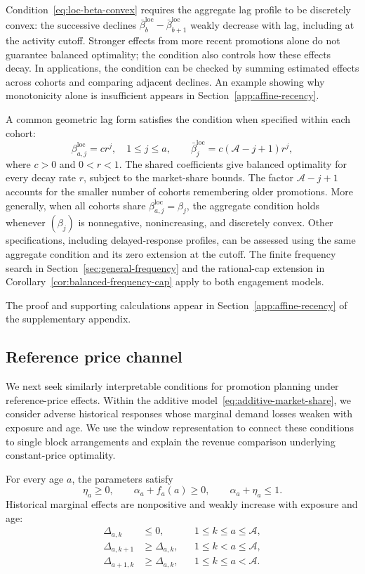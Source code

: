Condition~\eqref{eq:loc-beta-convex} requires the aggregate lag profile to be discretely convex: the successive declines \(\bar\beta_b^{\mathrm{loc}}-\bar\beta_{b+1}^{\mathrm{loc}}\) weakly decrease with lag, including at the activity cutoff. Stronger effects from more recent promotions alone do not guarantee balanced optimality; the condition also controls how these effects decay. In applications, the condition can be checked by summing estimated effects across cohorts and comparing adjacent declines. An example showing why monotonicity alone is insufficient appears in Section~\ref{app:affine-recency}.

A common geometric lag form satisfies the condition when specified within each cohort:
\[
 \beta_{a,j}^{\mathrm{loc}}=cr^j,\quad 1\le j\le a,
 \qquad \bar\beta_j^{\mathrm{loc}}=c(\mathcal A-j+1)r^j,
\]
where \(c>0\) and \(0<r<1\). The shared coefficients give balanced optimality for every decay rate \(r\), subject to the market-share bounds. The factor \(\mathcal A-j+1\) accounts for the smaller number of cohorts remembering older promotions. More generally, when all cohorts share \(\beta_{a,j}^{\mathrm{loc}}=\beta_j\), the aggregate condition holds whenever \((\beta_j)\) is nonnegative, nonincreasing, and discretely convex. Other specifications, including delayed-response profiles, can be assessed using the same aggregate condition and its zero extension at the cutoff. The finite frequency search in Section~\ref{sec:general-frequency} and the rational-cap extension in Corollary~\ref{cor:balanced-frequency-cap} apply to both engagement models.

The proof and supporting calculations appear in Section~\ref{app:affine-recency} of the supplementary appendix.
\par\endgroup

\begingroup\color{black}
\subsection{Reference price channel}
\label{sec:reference-engagement}
We next seek similarly interpretable conditions for promotion planning under reference-price effects. Within the additive model~\eqref{eq:additive-market-share}, we consider adverse historical responses whose marginal demand losses weaken with exposure and age. We use the window representation to connect these conditions to single block arrangements and explain the revenue comparison underlying constant-price optimality.

\begin{assumption}
\label{ass:additive-reference}
For every age \(a\), the parameters satisfy
\[
 \eta_a\ge0,
 \qquad \alpha_a+f_a(a)\ge0,
 \qquad \alpha_a+\eta_a\le1.
\]
Historical marginal effects are nonpositive and weakly increase with exposure and age:
\[
\begin{aligned}
 \Delta_{a,k}&\le0,
     &&1\le k\le a\le\mathcal A,\\
 \Delta_{a,k+1}&\ge\Delta_{a,k},
     &&1\le k<a\le\mathcal A,\\
 \Delta_{a+1,k}&\ge\Delta_{a,k},
     &&1\le k\le a<\mathcal A.
\end{aligned}
\]
\end{assumption}

